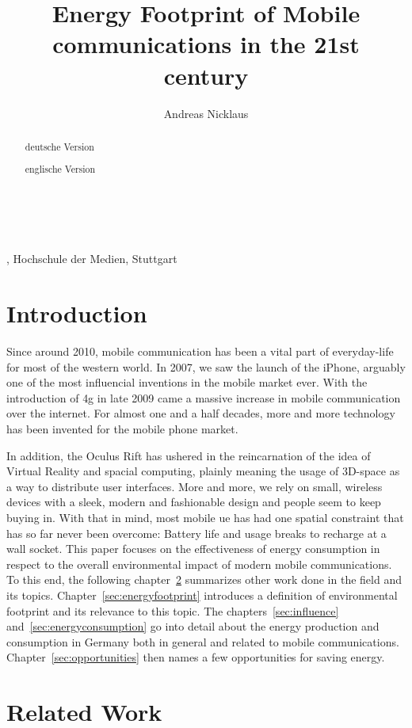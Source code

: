 \documentclass[11pt,a4paper]{article}
\title{Energy Footprint of Mobile communications in the 21st century}
\author{Andreas Nicklaus}
\makeatletter
\renewcommand\maketitle{
{\raggedright
\begin{center}
{\Large \bfseries \@title}\\[2ex] 
\@author\\[1ex] 
\@date, Hochschule der Medien, Stuttgart\\[1ex]
\end{center}}}
\makeatother
\begin{document}
\maketitle

\begin{abstract}
  deutsche Version
\end{abstract}


\begin{abstract}
  englische Version
\end{abstract}

\tableofcontents

\section{Introduction}\label{sec:intro}
Since around 2010, mobile communication has been a vital part of everyday-life for most of the western world.
In 2007, we saw the launch of the iPhone, arguably one of the most influencial inventions in the mobile market ever.
With the introduction of \acrfull{4g} in late 2009 came a massive increase in mobile communication over the internet.
For almost one and a half decades, more and more technology has been invented for the mobile phone market.

In addition, the Oculus Rift has ushered in the reincarnation of the idea of Virtual Reality and spacial computing, plainly meaning the usage of 3D-space as a way to distribute user interfaces.
More and more, we rely on small, wireless devices with a sleek, modern and fashionable design and people seem to keep buying in. 
With that in mind, most mobile \acrfull{ue} has had one spatial constraint that has so far never been overcome: Battery life and usage breaks to recharge at a wall socket.
This paper focuses on the effectiveness of energy consumption in respect to the overall environmental impact of modern mobile communications.
To this end, the following chapter~\ref{sec:relatedwork} summarizes other work done in the field and its topics.
Chapter~\ref{sec:energyfootprint} introduces a definition of environmental footprint and its relevance to this topic.
The chapters~\ref{sec:influence} and~\ref{sec:energyconsumption} go into detail about the energy production and consumption in Germany both in general and related to mobile communications.
Chapter~\ref{sec:opportunities} then names a few opportunities for saving energy.

\section{Related Work}\label{sec:relatedwork}
\end{document}
